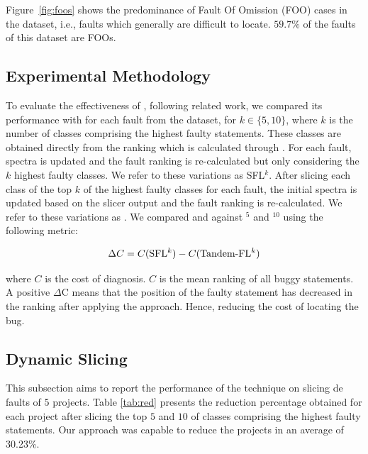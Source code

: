 \documentclass{article}
\begin{document}
Figure~\ref{fig:foos} shows the predominance of Fault Of Omission (FOO) cases in the dataset, i.e., faults which generally are difficult to locate. $59.7\%$ of the faults of this dataset are FOOs.


\subsection{Experimental Methodology}\label{sec:methodology}

To evaluate the effectiveness of \comb{}, following
related work, we compared its
performance with \sfl{} for each fault from
the dataset, for $k\in\{5,10\}$, where $k$ is the number of classes comprising the highest faulty statements. These classes are obtained directly
from the ranking which is calculated through \sfl{}. For each fault, spectra is updated and the fault ranking is re-calculated but only considering the $k$ highest faulty classes. We refer to these variations as SFL$^{k}$. After slicing each class of the top $k$ of the highest faulty classes for each fault, the initial spectra is updated based on the slicer output and the fault ranking is re-calculated. We refer to these variations as . We
compared  and  against \sfl{}$^{5}$ and \sfl{}$^{10}$ using the
following metric:

\begin{equation}
    \Delta{}C = C(\textrm{SFL$^{k}$}) - C(\textrm{Tandem-FL$^{k}$})
\end{equation}

\noindent
where $C$ is the cost of diagnosis. $C$ is the mean ranking of all buggy statements.
A positive $\Delta$C means that the position of the faulty statement has decreased
in the ranking after applying the  approach. Hence, reducing the cost of
locating the bug.

\subsection{Dynamic Slicing}\label{sec:ds}

This subsection aims to report the performance of the \ds{} technique on slicing de faults of $5$ \dfj{} projects. Table \ref{tab:red}
presents the reduction percentage obtained for each project after slicing the top $5$ and $10$ of classes comprising the highest faulty statements. Our approach was capable to reduce the \dfj{} projects in an average of 30.23\%.
\end{document}
